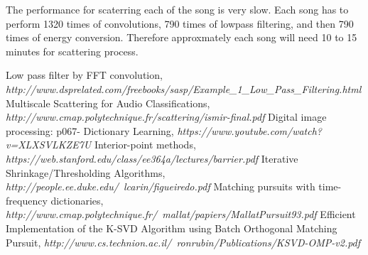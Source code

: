 \documentclass[final]{siamltexmm}
\begin{document}
The performance for scaterring each of the song is very slow. Each song has to perform 1320 times of convolutions, 790 times of lowpass filtering, and then 790 times of energy conversion. Therefore approxmately each song will need 10 to 15 minutes for scattering process.


\begin{thebibliography}{10}
 {\sc Low pass filter by FFT convolution}, {\em http://www.dsprelated.com/freebooks/sasp/Example\_1\_Low\_Pass\_Filtering.html}
 {\sc Multiscale Scattering for Audio Classifications}, {\em http://www.cmap.polytechnique.fr/scattering/ismir-final.pdf}
 {\sc Digital image processing: p067- Dictionary Learning}, {\em https://www.youtube.com/watch?v=XLXSVLKZE7U}
 {\sc Interior-point methods}, {\em https://web.stanford.edu/class/ee364a/lectures/barrier.pdf}
 {\sc Iterative Shrinkage/Thresholding Algorithms}, {\em http://people.ee.duke.edu/~lcarin/figueiredo.pdf}
 {\sc Matching pursuits with time-frequency dictionaries}, {\em http://www.cmap.polytechnique.fr/~mallat/papiers/MallatPursuit93.pdf}
 {\sc Efficient Implementation of the K-SVD Algorithm using Batch Orthogonal Matching Pursuit}, {\em http://www.cs.technion.ac.il/~ronrubin/Publications/KSVD-OMP-v2.pdf}
\end{thebibliography}
\end{document}
